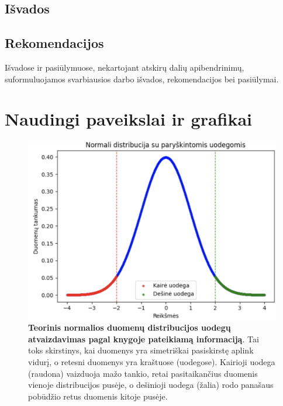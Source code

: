 \documentclass{VUMIFInfKursinis}
\begin{document}
\subsection{Išvados}
\subsection{Rekomendacijos}


Išvadose ir pasiūlymuose, nekartojant atskirų dalių apibendrinimų,
suformuluojamos svarbiausios darbo išvados, rekomendacijos bei pasiūlymai.

\printbibliography[heading=bibintoc] %

\appendix  %

\section{Naudingi paveikslai ir grafikai}


\begin{figure}[H]
    \centering
    \includegraphics[scale=0.1]{img/uodegos.png}
    \caption{\textbf{Teorinis normalios duomenų distribucijos uodegų atvaizdavimas pagal \cite{Statistika} knygoje pateikiamą informaciją}. Tai toks skirstinys, kai duomenys yra simetriškai pasiskirstę aplink vidurį, o retesni duomenys yra kraštuose (uodegose). \textcolor{raudona}{Kairioji uodega (raudona)} vaizduoja mažo tankio, retai pasitaikančius duomenis vienoje distribucijos pusėje, o \textcolor{zalia}{dešinioji uodega (žalia)} rodo panašaus pobūdžio retus duomenis kitoje pusėje.}  
    \label{img:uodegos}
\end{figure}
\end{document}
